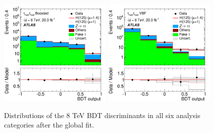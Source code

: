 \begin{figure}[tp]
  \includegraphics[width=0.48\textwidth]{figures/HIGG-2013-32/fig_08f}
  \includegraphics[width=0.48\textwidth]{figures/HIGG-2013-32/fig_08e}
  \caption{Distributions of the 8 TeV BDT discriminants in all six analysis categories after the global fit.}
  \label{fig:results-bdts}
\end{figure}

\clearpage


